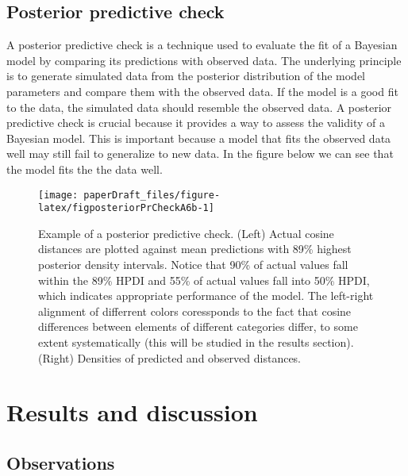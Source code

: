 \documentclass[
  10pt,
  dvipsnames,enabledeprecatedfontcommands]{scrartcl}
\begin{document}
\hypertarget{posterior-predictive-check}{%
\subsection{Posterior predictive
check}\label{posterior-predictive-check}}

A posterior predictive check is a technique used to evaluate the fit of
a Bayesian model by comparing its predictions with observed data. The
underlying principle is to generate simulated data from the posterior
distribution of the model parameters and compare them with the observed
data. If the model is a good fit to the data, the simulated data should
resemble the observed data. A posterior predictive check is crucial
because it provides a way to assess the validity of a Bayesian model.
This is important because a model that fits the observed data well may
still fail to generalize to new data. In the figure below we can see
that the model fits the the data well.

\begin{figure}[H]

\begin{center}\texttt{[image: paperDraft\_files/figure-latex/figposteriorPrCheckA6b-1]} \end{center}
\caption{Example of a posterior predictive check. (Left) Actual cosine distances are plotted against mean predictions with 89\% highest posterior density intervals. Notice that 90\% of actual values fall within the 89\% HPDI and 55\% of actual values fall into 50\% HPDI, which indicates appropriate performance of the model. The left-right alignment of differrent colors coressponds to the fact that cosine differences between elements of different categories differ, to some extent systematically (this will be studied in the results section). (Right) Densities of predicted and observed distances.}
\label{fig:posteriorCheck1}
\end{figure}

\normalsize

\hypertarget{results-and-discussion}{%
\section{Results and discussion}\label{results-and-discussion}}

\vspace{1mm}
\footnotesize

\hypertarget{observations}{%
\subsection{Observations}\label{observations}}
\end{document}
